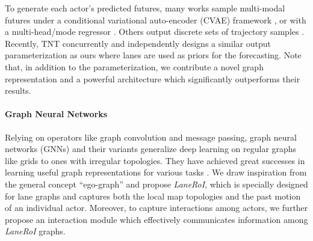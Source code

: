 To generate each actor's predicted futures, many works sample multi-modal futures under a conditional variational auto-encoder (CVAE) framework
\cite{desire,r2p2,mfp,precog,ilvm}, or with a multi-head/mode regressor
\cite{lgn,cui2019multimodal,mercat2020multi}.
Others output discrete sets of
trajectory samples \cite{dsd,covernet,multipath,jerryplan}. Recently, TNT \cite{tnt}
concurrently and independently designs a similar output parameterization as ours
where lanes are used as priors for the forecasting. 
Note that, in addition to the parameterization, we contribute a novel graph representation and a powerful
architecture which significantly outperforms their results.



\paragraph{Graph Neural Networks}
Relying on operators like graph convolution and message passing, graph neural networks (GNNs) and their variants \cite{scarselli2008graph,bruna2013spectral,li2015gated,kipf2016semi,hamilton2017inductive,liao2019lanczosnet} generalize deep learning on regular graphs like grids to ones with irregular topologies.
They have achieved great successes in learning useful graph representations for
various tasks \cite{monti2017geometric,qi20173d,teney2017graph,li2017situation,garcia2018few}.
We draw inspiration from the general concept ``ego-graph'' and propose \textit{LaneRoI}, which is specially designed for lane graphs and captures both the local map topologies and the past motion of an individual actor.
Moreover, to capture interactions among actors, we further propose an
interaction module which effectively communicates information among
\textit{LaneRoI} graphs.


